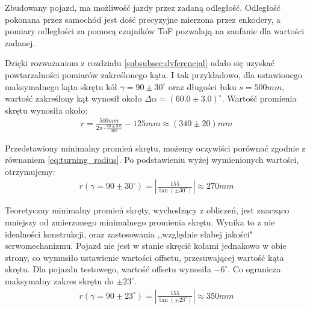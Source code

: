             Zbudowany pojazd, ma możliwość jazdy przez zadaną odległość. 
            Odległość pokonana przez samochód jest dość precyzyjne mierzona przez enkodery,
            a pomiary odległości za pomocą czujników ToF pozwalają na zaufanie dla wartości zadanej.

            Dzięki rozważaniom z rozdziału \ref{subsubsec:dyferencjal} udało się uzyskać powtarzalności pomiarów zakreślonego kąta.
            I tak przykładowo, dla ustawionego maksymalnego kąta skrętu kół $\gamma = 90 \pm 30^\circ$ oraz długości łuku $s = 500mm$, wartość zakreślony kąt wynosił około $\Delta \alpha = \left(60.0 \pm 3.0\right)^\circ$.
            Wartość promienia skrętu wynosiła około:
            \begin{gather}
                r = \frac{500mm}{2\pi \cdot \frac{60 \pm 3.0}{360}} - 125mm \approx (340 \pm 20)mm
            \end{gather}

            Przedstawiony minimalny promień skrętu, możemy oczywiści porównać zgodnie z równaniem \eqref{eq:turning_radius}.
            Po podstawieniu wyżej wymienionych wartości, otrzymujemy:
            \begin{gather}
                r(\gamma = 90 \pm 30^\circ) = \left|\frac{155}{\tan(\pm 30^\circ)}\right| \approx 270mm
            \end{gather}

            Teoretyczny minimalny promień skręty, wychodzący z obliczeń, jest znacząco mniejszy od zmierzonego minimalnego promienia skrętu.
            Wynika to z nie idealności konstrukcji, oraz zastosowania ,,względnie słabej jakości" serwomechanizmu.
            Pojazd nie jest w stanie skręcić kołami jednakowo w obie strony, co wymusiło ustawienie wartości offsetu, przesuwającej wartość kąta skrętu.
            Dla pojazdu testowego, wartość offsetu wynosiła $-6^\circ$. 
            Co ogranicza maksymalny zakres skrętu do $\pm 23^\circ$.
            \begin{gather}
                r(\gamma = 90 \pm 23^\circ) = \left|\frac{155}{\tan(\pm 23^\circ)}\right| \approx 350mm
            \end{gather}

